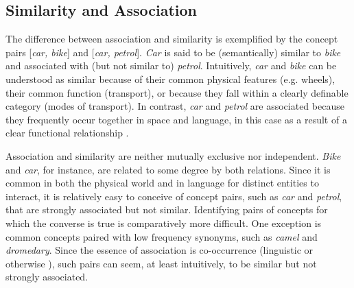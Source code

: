 \subsection{Similarity and Association} 

The difference between association and similarity is exemplified by the concept pairs [\emph{car, bike}] and [\emph{car, petrol}]. \emph{Car} is said to be (semantically) similar to \emph{bike} and associated with (but not similar to) \emph{petrol}. Intuitively, \emph{car} and \emph{bike} can be understood as similar because of their common physical features (e.g. wheels), their common function (transport), or because they fall within a clearly definable category (modes of transport). In contrast, \emph{car} and \emph{petrol} are associated because they frequently occur together in space and language, in this case as a result of a clear functional relationship \citep{plaut1995semantic,mcrae2012semantic}. 

Association and similarity are neither mutually exclusive nor independent. \emph{Bike} and \emph{car}, for instance, are related to some degree by both relations. Since it is common in both the physical world and in language for distinct entities to interact, it is relatively easy to conceive of concept pairs, such as \emph{car} and \emph{petrol}, that are strongly associated but not similar. Identifying pairs of concepts for which the converse is true is comparatively more difficult. One exception is common concepts paired with low frequency synonyms, such as \emph{camel} and \emph{dromedary}. Since the essence of association is co-occurrence (linguistic or otherwise \citep{mcrae2012semantic}), such pairs can seem, at least intuitively, to be similar but not strongly associated.  

